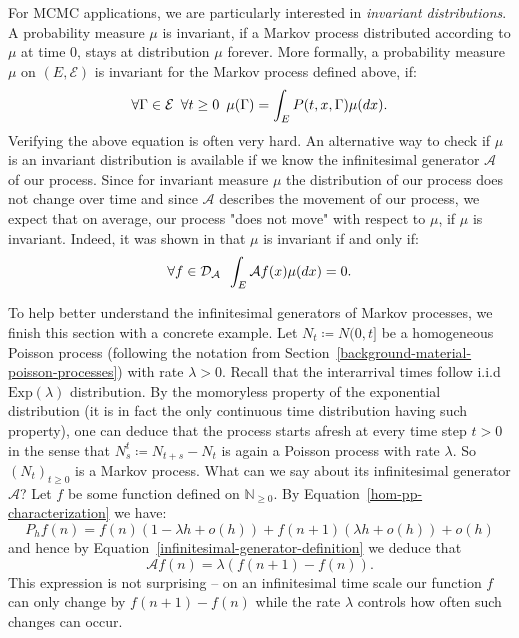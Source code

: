 \documentclass[report.tex]{subfiles}
\begin{document}
For MCMC applications, we are particularly interested in
\textit{invariant distributions}. A probability measure $\mu$ is invariant,
if a Markov process distributed according to $\mu$ at time $0$,
stays at distribution $\mu$ forever. More formally, a probability measure
$\mu$ on $(E, \mathcal{E})$ is invariant for the Markov process defined above, if:
$$\forall \Gamma \in \mathcal{E} \enskip \forall t \geq 0 \enskip \mu(\Gamma)
  = \int_{{E}}^{{}} {P(t, x, \Gamma)\mu(dx)}.$$
Verifying the above equation is often very hard.
An alternative way to check if $\mu$ is an invariant distribution is available
if we know the infinitesimal generator $\mathcal{A}$ of our process.
Since for invariant measure $\mu$ the distribution of our process does not change
over time and since $\mathcal{A}$ describes the movement of our process,
we expect that on average, our process "does not move" with respect to $\mu$,
if $\mu$ is invariant.
Indeed, it was shown in
\cite[Proposition 34.7] {davis1993markov} that $\mu$ is invariant if and only if:
\begin{equation}
  \label{infinitesimal-generator-invariance}
  \forall f \in \mathcal{D}_{\mathcal{A}} \enskip
  \int_{{E}}^{{}} {\mathcal{A}f(x)\mu(dx)} = 0.
\end{equation}

To help better understand the infinitesimal generators of Markov processes, we
finish this section with a concrete example.
Let $N_{t} \coloneqq N(0, t]$ be a homogeneous Poisson process (following the
notation from Section~\ref{background-material-poisson-processes})
with rate $\lambda > 0$. Recall that the interarrival times follow i.i.d
$\text{Exp}(\lambda)$ distribution. By the momoryless property of the exponential
distribution (it is in fact the only continuous time distribution having such
property), one can deduce that the process starts afresh at every time step
$t > 0$ in the sense that $N_{s}^{t} \coloneqq N_{t + s} - N_{t}$ is again a
Poisson process with rate $\lambda$. So $(N_{t})_{t \geq 0}$ is a Markov process.
What can we say about its infinitesimal generator $\mathcal{A}$? Let $f$ be some
function defined on $\mathbb{N}_{\geq 0}$.
By Equation~\ref{hom-pp-characterization}
we have:
$$P_{h}f(n) = f(n)(1 - \lambda h + o(h)) + f(n+1)(\lambda h + o(h)) + o(h)$$
and hence by Equation~\ref{infinitesimal-generator-definition} we deduce that
\begin{equation}
  \label{pp-infinitesimal-generator}
  \mathcal{A}f(n) = \lambda(f(n+1) - f(n)).
\end{equation}
This expression is not surprising -- on an infinitesimal time scale our function $f$
can only change by $f(n+1) - f(n)$ while the rate $\lambda$ controls how often
such changes can occur.
\end{document}
